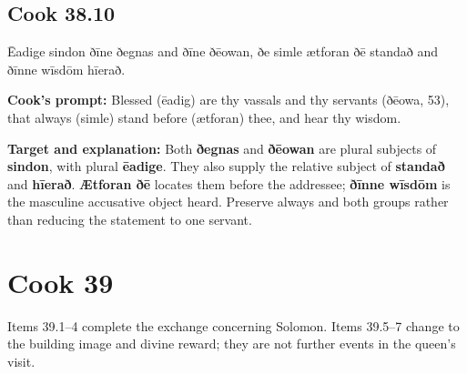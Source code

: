 \par\begin{minipage}{\linewidth}\raggedright
\subsection*{Cook 38.10}

Ēadige sindon ðīne ðegnas and ðīne ðēowan, ðe simle ætforan ðē standað and ðīnne wīsdōm hīerað.

\textbf{Cook's prompt:} Blessed (ēadig) are thy vassals and thy servants (ðēowa, 53), that always (simle) stand before (ætforan) thee, and hear thy wisdom.

\textbf{Target and explanation:} Both \textbf{ðegnas} and \textbf{ðēowan} are plural subjects of \textbf{sindon}, with plural \textbf{ēadige}. They also supply the relative subject of \textbf{standað} and \textbf{hīerað}. \textbf{Ætforan ðē} locates them before the addressee; \textbf{ðīnne wīsdōm} is the masculine accusative object heard. Preserve always and both groups rather than reducing the statement to one servant.

\end{minipage}\par\addvspace{4pt}

\clearpage
\section*{Cook 39}

Items 39.1–4 complete the exchange concerning Solomon. Items 39.5–7 change to the building image and divine reward; they are not further events in the queen's visit.

